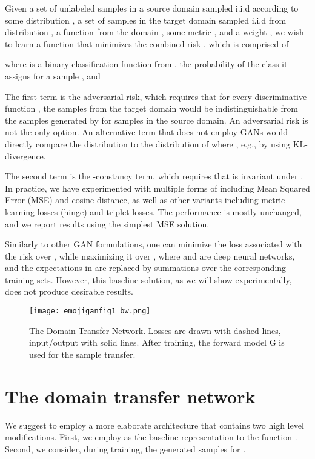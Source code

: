 \documentclass{article} \usepackage{iclr2017_conference,times}
\begin{document}
Given a set  of unlabeled samples in a source domain  sampled i.i.d according to some distribution , a set of samples in the target domain  sampled i.i.d from distribution , a function  from the domain , some metric , and a weight , we wish to learn a function  that minimizes the combined risk , which is comprised of



where  is a binary classification function from ,  the probability of the class  it assigns for a sample ,  and 


The first term is the adversarial risk, which requires that for every discriminative function , the samples from the target domain would be indistinguishable from the samples generated by  for samples in the source domain. An adversarial risk is not the only option. An alternative term that does not employ GANs would directly compare the distribution  to the distribution  of  where , e.g., by using KL-divergence.

The second term is the -constancy term, which requires that  is invariant under . In practice, we have experimented with multiple forms of  including Mean Squared Error (MSE) and cosine distance, as well as other variants including metric learning losses (hinge) and triplet losses. The performance is mostly unchanged, and we report results using the simplest MSE solution.

Similarly to other GAN formulations, one can minimize the loss associated with the risk  over , while maximizing it over , where  and  are deep neural networks, and the expectations in  are replaced by summations over the corresponding training sets. However, this baseline solution, as we will show experimentally, does not produce desirable results.

\begin{figure}[H]
\centering
\texttt{[image: emojiganfig1\_bw.png]}
\caption{\label{fig:illustration}The Domain Transfer Network. Losses are drawn with dashed lines, input/output with solid lines. After training, the forward model G is used for the sample transfer.}
\end{figure}

\section{The domain transfer network}

We suggest to employ a more elaborate architecture that contains two high level modifications. First, we employ  as the baseline representation to the function . Second, we consider, during training, the generated samples  for . 
\end{document}
